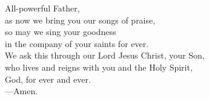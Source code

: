 \prayer


\begin{prayerverse}
All-powerful Father,\\
as now we bring you our songs of praise,\\
so may we sing your goodness\\
in the company of your saints for ever.\\
We ask this through our Lord Jesus Christ, your Son,\\
who lives and reigns with you and the Holy Spirit,\\
God, for ever and ever.\\
{\color{red}---\thinspace}Amen.
\end{prayerverse}


